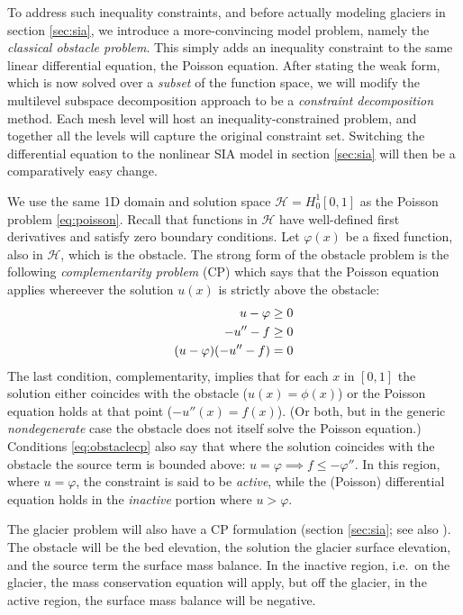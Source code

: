 \documentclass[letterpaper,final,12pt,reqno]{amsart}
\numberwithin{equation}{section}
\numberwithin{figure}{section}
\numberwithin{table}{section}
\begin{document}
To address such inequality constraints, and before actually modeling glaciers in section \ref{sec:sia}, we introduce a more-convincing model problem, namely the \emph{classical obstacle problem}.  This simply adds an inequality constraint to the same linear differential equation, the Poisson equation.  After stating the weak form, which is now solved over a \emph{subset} of the function space, we will modify the multilevel subspace decomposition approach to be a \emph{constraint decomposition} method.  Each mesh level will host an inequality-constrained problem, and together all the levels will capture the original constraint set.  Switching the differential equation to the nonlinear SIA model in section \ref{sec:sia} will then be a comparatively easy change.

We use the same 1D domain and solution space $\mathcal{H}=H_0^1[0,1]$ as the Poisson problem \eqref{eq:poisson}.  Recall that functions in $\mathcal{H}$ have well-defined first derivatives and satisfy zero boundary conditions.  Let $\varphi(x)$ be a fixed function, also in $\mathcal{H}$, which is the obstacle.  The strong form of the obstacle problem is the following \emph{complementarity problem} (CP) \cite{Bueler2021,KinderlehrerStampacchia1980} which says that the Poisson equation applies whereever the solution $u(x)$ is strictly above the obstacle:
\begin{align}
  u - \varphi &\ge 0 \label{eq:obstaclecp} \\
  -u''-f &\ge 0 \notag \\
  (u-\varphi)(-u''-f) &= 0 \notag
\end{align}
The last condition, complementarity, implies that for each $x$ in $[0,1]$ the solution either coincides with the obstacle ($u(x)=\phi(x)$) or the Poisson equation holds at that point ($-u''(x)=f(x)$).  (Or both, but in the generic \emph{nondegenerate} \cite{KinderlehrerStampacchia1980} case the obstacle does not itself solve the Poisson equation.)  Conditions \eqref{eq:obstaclecp} also say that where the solution coincides with the obstacle the source term is bounded above: $u=\varphi \implies f \le -\varphi''$.  In this region, where $u=\varphi$, the constraint is said to be \emph{active}, while the (Poisson) differential equation holds in the \emph{inactive} portion where $u>\varphi$.

The glacier problem will also have a CP formulation (section \ref{sec:sia}; see also \cite{Calvoetal2002}).  The obstacle will be the bed elevation, the solution the glacier surface elevation, and the source term the surface mass balance.  In the inactive region, i.e.~on the glacier, the mass conservation equation will apply, but off the glacier, in the active region, the surface mass balance will be negative.
\end{document}
